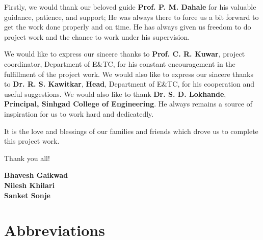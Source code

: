 \documentclass[12pt]{report}
\begin{document}
\begin{Certificatepage}
\begin{center}
\begin{justify}
Firstly, we would thank our beloved guide \textbf{Prof. P. M. Dahale} for his valuable guidance, patience, and support; He was always there to force us a bit forward to get the work done properly and on time. He has always given us freedom to do project work and the chance to work under his supervision. 

\vspace{0.5cm} %

We would like to express our sincere thanks to \textbf{Prof. C. R. Kuwar}, project coordinator, Department of E\&TC, for his constant encouragement in the fulfillment of the project work. We would also like to express our sincere thanks to \textbf{Dr. R. S. Kawitkar}, \textbf{Head}, Department of E\&TC, for his cooperation and useful suggestions. We would also like to thank \textbf{Dr. S. D. Lokhande}, \textbf{Principal, Sinhgad College of Engineering}. He always remains a source of inspiration for us to work hard and dedicatedly.

\vspace{0.5cm} %

It is the love and blessings of our families and friends which drove us to complete this project work.

\vspace{0.5cm} %

Thank you all!

\vspace{2cm}
\begin{flushright}
\textbf{Bhavesh Gaikwad} \\
\textbf{Nilesh Khilari} \\
\textbf{Sanket Sonje}
\end{flushright}
\setlength{\parindent}{15pt} %





\newpage

\chapter*{Abbreviations}


\end{justify}
\end{center}
\end{Certificatepage}
\end{document}
